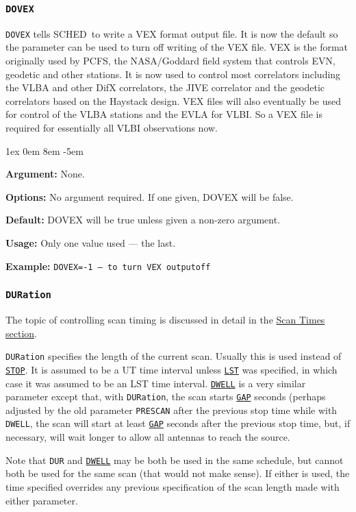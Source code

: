 \documentclass{report}
\newcommand{\schedb}{{\sc SCHED~}}
\newcommand{\rcwbox}[5]{
  \begin{list}{}{\parsep 1ex  \itemsep 0em
                 \leftmargin 8em  \itemindent -5em }
    \item {\bf Argument:} #1
    \item {\bf Options:}  #2
    \item {\bf Default:}  #3
    \item {\bf Usage:}    #4
    \item {\bf Example:}  #5
  \end{list}
}
\begin{document}
\subsubsection{\label{MP:DOVEX}{\tt DOVEX}}

{\tt DOVEX} tells \schedb to write a VEX format output file. It is now
the default so the parameter can be used to turn off writing of the
VEX file.  VEX is the format originally used by PCFS, the NASA/Goddard
field system that controls EVN, geodetic and other stations. It is now
used to control most correlators including the VLBA and other DifX
correlators, the JIVE correlator and the geodetic correlators based on
the Haystack design.  VEX files will also eventually be used for
control of the VLBA stations and the EVLA for VLBI.  So a VEX file is
required for essentially all VLBI observations now.


\rcwbox
{None.}
{No argument required.  If one given, DOVEX will be false.}
{DOVEX will be true unless given a non-zero argument.}
{Only one value used --- the last.}
{{\tt DOVEX=-1 --- to turn VEX outputoff}}


\subsubsection{\label{MP:DUR}{\tt DURation}}

The topic of controlling scan timing is discussed in detail in
the 
{\hyperref[SSEC:SCANTIMES]{Scan Times section}}.

{\tt DURation} specifies the length of the current scan. Usually this
is used instead of 
{\hyperref[MP:STOP]{{\tt STOP}}}. It is assumed to be
a UT time interval unless 
{\hyperref[MP:LST]{{\tt LST}}} was specified,
in which case it was assumed to be an LST time interval.
{\hyperref[MP:DWELL]{{\tt DWELL}}} is a very similar parameter except
that, with {\tt DURation}, the scan starts 
{\hyperref[MP:GAP]{{\tt GAP}}}
seconds (perhaps adjusted by the old parameter {\tt PRESCAN} after the
previous stop time while with {\tt DWELL}, the scan will start at least
{\hyperref[MP:GAP]{{\tt GAP}}} seconds after the previous stop time, but,
if necessary, will wait longer to allow all antennas to reach the
source.

Note that {\tt DUR} and 
{\hyperref[MP:DWELL]{{\tt DWELL}}}
may be both be used in the same schedule, but cannot both be used
for the same scan (that would not make sense).  If either is used,
the time specified overrides any previous specification of the
scan length made with either parameter.
\end{document}
